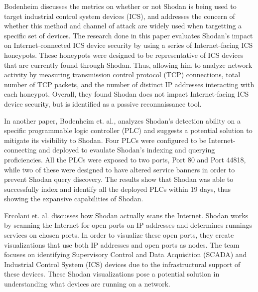 



Bodenheim \cite{afit//CSAR-10-025-01} discusses the metrics
on whether or not Shodan is being used to target industrial control
system devices (ICS), and addresses the concern of 
whether this method and channel of attack are widely used when targetting 
a specific set of devices. The research done in this paper evaluates Shodan's impact 
on Internet-connected ICS device security by using a series of Internet-facing ICS honeypots.
These honeypots were designed to be representative of ICS devices that are 
currently found through Shodan. Thus, allowing him to analyze network activity by measuring
transmission control protocol (TCP) connections, total number of TCP packets, and
the number of distinct IP addresses interacting with each honeypot. Overall, they found
Shodan does not impact Internet-facing ICS device security, but is identified as a passive
reconnaissance tool.

In another paper, Bodenheim et. al.\cite{bodenheim_shodan_ics},
analyzes Shodan's detection ability on a specific programmable logic controller (PLC)
and suggests a potential solution to mitigate its visibility to Shodan. Four PLCs were
configured to be Internet-connecting and deployed to evaulate Shodan's indexing and
querying proficiencies. All the PLCs were exposed to two ports, Port 80 and Port 44818,
while two of these were designed to have altered service banners in order to prevent
Shodan query discovery. The results show that Shodan was able to successfully 
index and identify all the deployed PLCs within 19 days, thus showing the
expansive capabilities of Shodan.

Ercolani et. al.\cite{shodan_vis} discusses how Shodan actually
scans the Internet. Shodan works by scanning the Internet for open ports on 
IP addresses and determines runnings services on chosen ports. In order to
visualize these open ports, they create visualizations that use both IP addresses
and open ports as nodes. The team focuses on identifying Supervisory Control and
Data Acquisition (SCADA) and Industrial Control System (ICS) devices due to the
infrastructural support of these devices. These Shodan visualizations pose a
potential solution in understanding what devices are running on a network.


